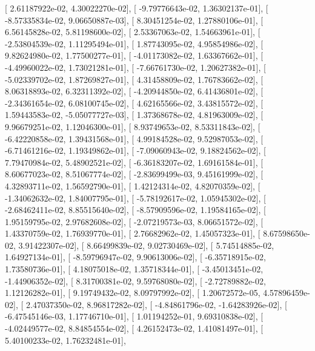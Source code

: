 \documentclass{article}
\begin{document}
       [  2.61187922e-02,   4.30022270e-02],
       [ -9.79776643e-02,   1.36302137e-01],
       [ -8.57335834e-02,   9.06650887e-03],
       [  8.30451254e-02,   1.27880106e-01],
       [  6.56145828e-02,   5.81198600e-02],
       [  2.53367063e-02,   1.54663961e-01],
       [ -2.53804539e-02,   1.11295494e-01],
       [  1.87743095e-02,   4.95854986e-02],
       [  9.82624980e-02,   1.77500277e-01],
       [ -4.01173082e-02,   1.63367662e-01],
       [ -4.49960022e-02,   1.73021281e-01],
       [ -7.66761730e-02,   1.20627382e-01],
       [ -5.02339702e-02,   1.87269827e-01],
       [  4.31458809e-02,   1.76783662e-02],
       [  8.06318893e-02,   6.32311392e-02],
       [ -4.20944850e-02,   6.41436801e-02],
       [ -2.34361654e-02,   6.08100745e-02],
       [  4.62165566e-02,   3.43815572e-02],
       [  1.59443583e-02,  -5.05077727e-03],
       [  1.37368678e-02,   4.81963009e-02],
       [  9.96679251e-02,   1.12046300e-01],
       [  8.93749653e-02,   8.53311843e-02],
       [ -6.42220858e-02,   1.39431568e-01],
       [  4.99184528e-02,   9.52987053e-02],
       [ -6.71461216e-02,   1.19349862e-01],
       [ -7.09060943e-02,   9.18824562e-02],
       [  7.79470984e-02,   5.48902521e-02],
       [ -6.36183207e-02,   1.69161584e-01],
       [  8.60677023e-02,   8.51067774e-02],
       [ -2.83699499e-03,   9.45161999e-02],
       [  4.32893711e-02,   1.56592790e-01],
       [  1.42124314e-02,   4.82070359e-02],
       [ -1.34062632e-02,   1.84007795e-01],
       [ -5.78192617e-02,   1.05945302e-02],
       [ -2.68462411e-02,   8.85515640e-02],
       [ -8.57909596e-02,   1.19584165e-02],
       [  1.95159795e-02,   2.97682608e-02],
       [ -2.07219573e-03,   8.06651572e-02],
       [  1.43370759e-02,   1.76939770e-01],
       [  2.76682962e-02,   1.45057323e-01],
       [  8.67598650e-02,   3.91422307e-02],
       [  8.66499839e-02,   9.02730469e-02],
       [  5.74514885e-02,   1.64927134e-01],
       [ -8.59796947e-02,   9.90613006e-02],
       [ -6.35718915e-02,   1.73580736e-01],
       [  4.18075018e-02,   1.35718344e-01],
       [ -3.45013451e-02,  -1.44906352e-02],
       [  8.31700381e-02,   9.59768080e-02],
       [ -2.72789882e-02,   1.12126282e-01],
       [  9.19749432e-02,   8.09797992e-02],
       [  1.20672572e-05,   4.57896459e-02],
       [  2.47037350e-02,   8.96817282e-02],
       [ -4.84861796e-02,  -1.64283926e-02],
       [ -6.47545146e-03,   1.17746710e-01],
       [  1.01194252e-01,   9.69310838e-02],
       [ -4.02449577e-02,   8.84854554e-02],
       [  4.26152473e-02,   1.41081497e-01],
       [  5.40100233e-02,   1.76232481e-01],
\end{document}
